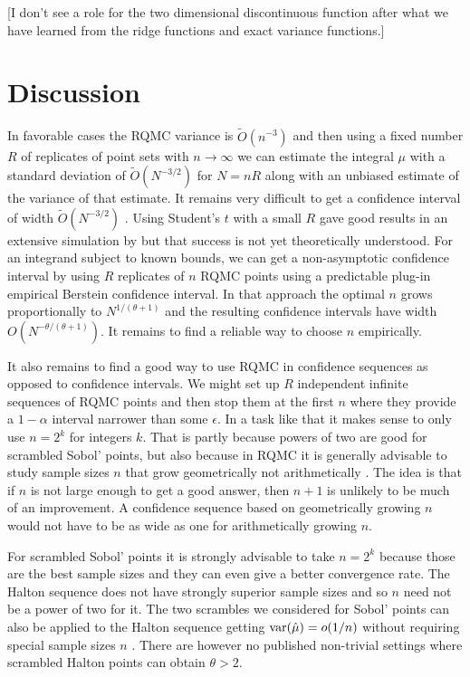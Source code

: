 \documentclass{article}
\newcommand{\art}[1]{\begingroup\color{blue}#1\endgroup}
\begin{document}
\art{[I don't see a role for the two dimensional
discontinuous function after what we have 
learned from the ridge functions and exact
variance functions.]}

\section{Discussion}\label{sec:discussion}

In favorable cases
the RQMC variance is $\tilde O(n^{-3})$ and then
using a fixed number $R$ of replicates of
point sets with $n\to\infty$ we can estimate
the integral $\mu$ with a standard deviation 
of $\tilde O(N^{-3/2})$ for $N=nR$ along with
an unbiased estimate of the variance of that estimate.
It remains very difficult to get a confidence 
interval of width $\tilde O(N^{-3/2})$ \cite{err4qmc}.
Using Student's $t$ with a small $R$ gave good
results in an extensive simulation by \cite{LEcEtal24a}
but that success is not yet theoretically understood.
For an integrand subject to known bounds, we can get
a non-asymptotic confidence interval by using $R$
replicates of $n$ RQMC points using a
predictable plug-in empirical Berstein confidence
interval.  In that approach the optimal $n$
grows proportionally to $N^{1/(\theta+1)}$ and
the resulting confidence intervals have width
$O(N^{-\theta/(\theta+1)})$.
It remains to find a reliable way to choose $n$
empirically. 

It also remains to find a good way to
use RQMC in confidence sequences as opposed
to confidence intervals.   We might
set up $R$ independent infinite sequences of RQMC
points and then stop them at the first $n$
where they provide a $1-\alpha$ interval
narrower than some $\epsilon$.  In a task
like that it makes sense to only use
$n=2^k$ for integers $k$. 
That is partly because powers of two are good
for scrambled Sobol' points, but also because
in RQMC it is generally advisable to study
sample sizes $n$ that grow geometrically
not arithmetically \cite{sobo:1998}.  The
idea is that if $n$ is not large enough to get
a good answer, then $n+1$ is unlikely to be
much of an improvement.
A confidence sequence based on geometrically
growing $n$ would not have to be as wide as one for arithmetically
growing $n$.

\art{For scrambled Sobol' points it is strongly
advisable to take $n=2^k$ because those are
the best sample sizes and they can even give
a better convergence rate. The Halton sequence \cite{Hal60} does
not have strongly superior sample sizes and so $n$ need
not be a power of two for it.  The 
two scrambles we considered for Sobol' points can
also be applied to the Halton sequence getting
$\operatorname{var}(\hat\mu)=o(1/n)$ without requiring special
sample sizes $n$ \cite{haltongain}.
There are however no published non-trivial settings
where scrambled Halton points can obtain $\theta>2$.
}
\end{document}
